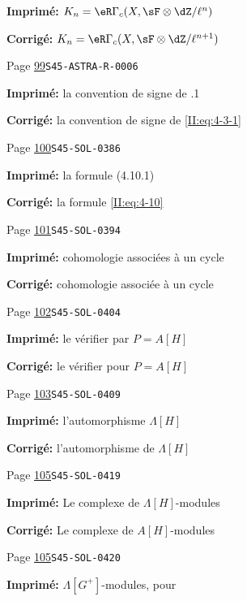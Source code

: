 \documentclass[oneside]{book}
\theoremstyle{sga-source}
\theoremstyle{sga-source-dash}
\theoremstyle{sga-source-dotdash}
\theoremstyle{sga-source-number-note-dash}
\theoremstyle{sga-source-note-number-dotdash}
\theoremstyle{sga-source-example-dotdash}
\theoremstyle{sga-source-inline-number}
\theoremstyle{sga-source-bare-number}
\theoremstyle{sga-source}
\begin{document}
\begin{description}
\par\noindent\textbf{Imprimé:} $K_n=\eR\Gamma_c(X,\sF\otimes\dZ/\ell^n)$
\par\noindent\textbf{Corrigé:} $K_n=\eR\Gamma_c(X,\sF\otimes\dZ/\ell^{n+1})$
\smallskip
\item[\hypertarget{apparatus:FR-0055}{55}] Page \hyperlink{printpage:fr:99}{99}\quad\texttt{S45-ASTRA-R-0006}
\par\noindent\textbf{Imprimé:} la convention de signe de .1
\par\noindent\textbf{Corrigé:} la convention de signe de \ref{II:eq:4-3-1}
\smallskip
\item[\hypertarget{apparatus:FR-0056}{56}] Page \hyperlink{printpage:fr:100}{100}\quad\texttt{S45-SOL-0386}
\par\noindent\textbf{Imprimé:} la formule (4.10.1)
\par\noindent\textbf{Corrigé:} la formule \eqref{II:eq:4-10}
\smallskip
\item[\hypertarget{apparatus:FR-0057}{57}] Page \hyperlink{printpage:fr:101}{101}\quad\texttt{S45-SOL-0394}
\par\noindent\textbf{Imprimé:} cohomologie associées à un cycle
\par\noindent\textbf{Corrigé:} cohomologie associée à un cycle
\smallskip
\item[\hypertarget{apparatus:FR-0058}{58}] Page \hyperlink{printpage:fr:102}{102}\quad\texttt{S45-SOL-0404}
\par\noindent\textbf{Imprimé:} le vérifier par $P=A[H]$
\par\noindent\textbf{Corrigé:} le vérifier pour $P=A[H]$
\smallskip
\item[\hypertarget{apparatus:FR-0059}{59}] Page \hyperlink{printpage:fr:103}{103}\quad\texttt{S45-SOL-0409}
\par\noindent\textbf{Imprimé:} l'automorphisme $\Lambda[H]$
\par\noindent\textbf{Corrigé:} l'automorphisme de $\Lambda[H]$
\smallskip
\item[\hypertarget{apparatus:FR-0060}{60}] Page \hyperlink{printpage:fr:105}{105}\quad\texttt{S45-SOL-0419}
\par\noindent\textbf{Imprimé:} Le complexe de $\Lambda[H]$-modules
\par\noindent\textbf{Corrigé:} Le complexe de $A[H]$-modules
\smallskip
\item[\hypertarget{apparatus:FR-0061}{61}] Page \hyperlink{printpage:fr:105}{105}\quad\texttt{S45-SOL-0420}
\par\noindent\textbf{Imprimé:} $\Lambda[G^+]$-modules, pour

\end{description}
\end{document}

